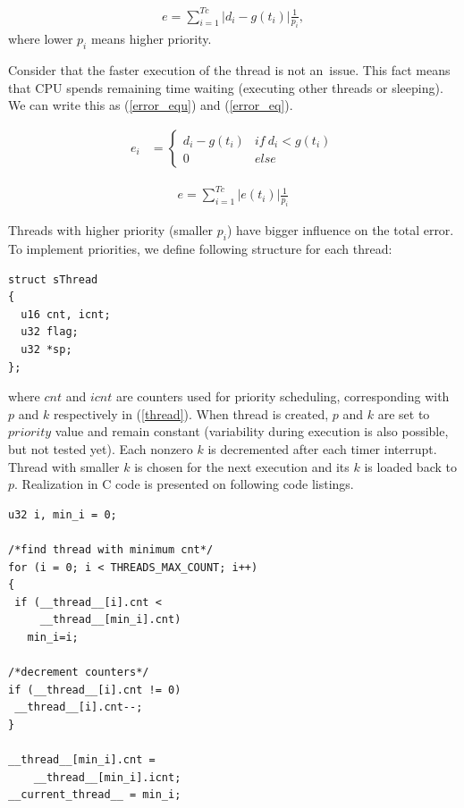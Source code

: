 \documentclass[a4paper, conference]{IEEEtran}
\begin{document}
\begin{align}
e = \sum_{i=1}^{Tc} |d_i - g(t_i)|\frac{1}{p_i} ,
\end{align}
where lower $p_i$ means higher priority.

Consider that the faster execution of the thread is not an~issue. This fact means that CPU spends remaining time waiting (executing other threads or sleeping). We can write this as  (\ref{error_equ})  and (\ref{error_eq}).

\begin{align}
\label{error_equ}
	 e_i &=				
	  \begin{cases}			
	   d_i - g(t_i) & if\ d_i < g(t_i) \\
	   0       & else
	  \end{cases}
\end{align}

\begin{align}
\label{error_eq}
e = \sum_{i=1}^{Tc} |e(t_i)|\frac{1}{p_i}
\end{align}

Threads with higher priority (smaller $p_i$) have bigger influence on the total error. To implement priorities, we define following structure for each thread:
\noindent\begin{minipage}{.45\textwidth}
\lstset{language=C++}    
\begin{lstlisting}[frame=single, caption = thread structure]
struct sThread
{
  u16 cnt, icnt;
  u32 flag; 
  u32 *sp;
};
\end{lstlisting}
\end{minipage}\hfill
where $cnt$ and $icnt$ are counters used for priority scheduling, corresponding with $p$ and $k$ respectively in (\ref{thread}).
When thread is created, $p$ and $k$ are set to $priority$ value and remain constant (variability during execution is also possible, but not tested yet).
Each nonzero $k$ is decremented after each timer interrupt. Thread with smaller $k$ is chosen for the next execution and its $k$ is loaded back to $p$.
Realization in C code is presented on following code listings.

\noindent\begin{minipage}{.45\textwidth}
\lstset{language=C++}    
\begin{lstlisting}[frame=single, caption = priority scheduler]
u32 i, min_i = 0;

/*find thread with minimum cnt*/
for (i = 0; i < THREADS_MAX_COUNT; i++) 
{
 if (__thread__[i].cnt < 
     __thread__[min_i].cnt) 
   min_i=i;

/*decrement counters*/
if (__thread__[i].cnt != 0)
 __thread__[i].cnt--;
}

__thread__[min_i].cnt = 
	__thread__[min_i].icnt;
__current_thread__ = min_i;
\end{lstlisting}
\end{minipage}\hfill
\end{document}
